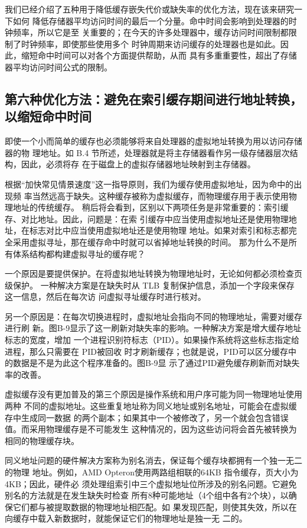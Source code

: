 我们已经介绍了五种用于降低缓存嵌失代价或缺失率的优化方法，现在该来研究一下如何
降低存储器平均访问时间的最后一个分量。命中时间会影响到处理器的时钟频率，所以它是至
关重要的；在今天的许多处理器中，缓存访问时间限制都限制了时钟频率，即使那些使用多个
时钟周期来访问缓存的处理器也是如此。因此，缩短命中时间可以对各个方面提供帮助，从而
具有多重重要性，超出了存储器平均访问时间公式的限制。

\subsection{第六种优化方法：避免在索引缓存期间进行地址转换，以缩短命中时间}
即使一个小而简单的缓存也必须能够将来自处理器的虚拟地址转换为用以访问存储器的物
理地址。如 B.4 节所述，处理器就是将主存储器看作另一级存储器层次结构，因此，必须将存
在于磁盘上的虚拟存储器地址映射到主存储器。

根据“加快常见情景速度”这一指导原则，我们为缓存使用虚拟地址，因为命中的出现频
率当然远高于缺失。这种缓存被称为虚拟缓存，而物理缓存用于表示使用物理地址的传统缓存。
稍后将会看到，区别以下两项任务是非常重要的：索引缓存、对比地址。因此，问题是：在索
引缓存中应当使用虚拟地址还是使用物理地址，在标志对比中应当使用虚拟地址还是使用物理
地址。如果对索引和标志都完全采用虚拟寻址，那在缓存命中时就可以省掉地址转换的时间。
那为什么不是所有体系结构都构建虚拟寻址的缓存呢？

一个原因是要提供保护。在将虚拟地址转换为物理地址时，无论如何都必须检查页级保护。
一种解决方案是在缺失时从 TLB 复制保护信息，添加一个字段来保存这一信息，然后在每次访
问虚拟寻址缓存时进行核对。

另一个原因是：在每次切换进程时，虚拟地址会指向不同的物理地址，需要对缓存进行刷
新。图B-9显示了这一刷新对缺失率的影响。一种解决方案是增大缓存地址标志的宽度，增加
一个进程识别符标志（PID）。如果操作系统将这些标志指定给进程，那么只需要在 PID被回收
时才刷新缓存；也就是说，PID可以区分缓存中的数据是不是为此这个程序准备的。图B-9显
示了通过PID避免缓存刷新而对缺失率的改善。

虚拟缓存没有更加普及的第三个原因是操作系统和用户序可能为同一物理地址使用两种
不同的虚拟地址。这些重复地址称为同义地址或别名地址，可能会在虚拟缓存中生成同一数据
的两个副本；如果其中一个被修改了，另一个就会包含错误值。而采用物理缓存是不可能发生
这种情况的，因为这些访问将会首先被转换为相同的物理缓存块。

同义地址问题的硬件解决方案称为别名消去，保证每个缓存块都拥有一个独一无二的物理
地址。例如，AMD Opteron使用两路组相联的64KB 指令缓存，页大小为4KB；因此，硬件必
须处理组索引中三个虚拟地址位所涉及的别名问题。它避免别名的方法就是在发生缺失时检查
所有8种可能地址（4个组中各有2个块），以确保它们都与被提取数据的物理地址相匹配。如
果发现匹配，则使其失效，所以在向缓存中载入新数据时，就能保证它们的物理地址是独一无
二的。


